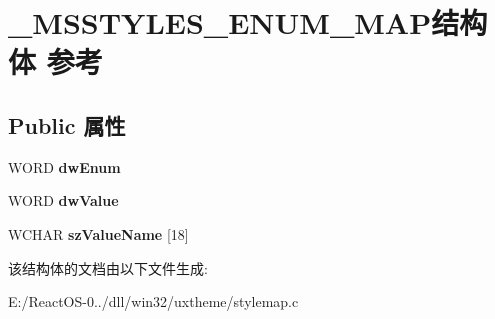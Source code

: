 \hypertarget{struct___m_s_s_t_y_l_e_s___e_n_u_m___m_a_p}{}\section{\+\_\+\+M\+S\+S\+T\+Y\+L\+E\+S\+\_\+\+E\+N\+U\+M\+\_\+\+M\+A\+P结构体 参考}
\label{struct___m_s_s_t_y_l_e_s___e_n_u_m___m_a_p}
\subsection*{Public 属性}
\begin{DoxyCompactItemize}
\item 
\mbox{\label{struct___m_s_s_t_y_l_e_s___e_n_u_m___m_a_p_a8b76c9e6e67dc712fe893d6691409ba1}} 
W\+O\+RD {\bfseries dw\+Enum}
\item 
\mbox{\label{struct___m_s_s_t_y_l_e_s___e_n_u_m___m_a_p_a1a4be9da905ebc7e9fd3e962caf95e57}} 
W\+O\+RD {\bfseries dw\+Value}
\item 
\mbox{\label{struct___m_s_s_t_y_l_e_s___e_n_u_m___m_a_p_a2a1a64aea2aab4f18fd47185e9949817}} 
W\+C\+H\+AR {\bfseries sz\+Value\+Name} \mbox{[}18\mbox{]}
\end{DoxyCompactItemize}


该结构体的文档由以下文件生成\+:\begin{DoxyCompactItemize}
\item 
E\+:/\+React\+O\+S-\/0../dll/win32/uxtheme/stylemap.\+c\end{DoxyCompactItemize}
